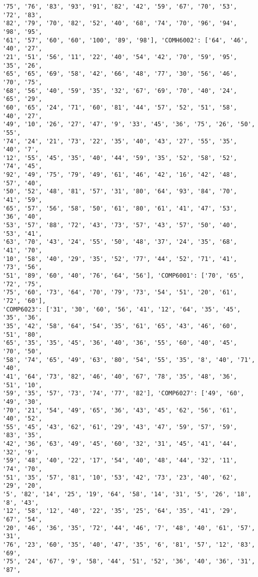 \documentclass[11pt]{article}
\begin{document}
\begin{Verbatim}[commandchars=\\\{\}]
'75', '76', '83', '93', '91', '82', '42', '59', '67', '70', '53', '72', '83',
'82', '79', '70', '82', '52', '40', '68', '74', '70', '96', '94', '98', '95',
'61', '57', '60', '60', '100', '89', '98'], 'COMH6002': ['64', '46', '40', '27',
'21', '51', '56', '11', '22', '40', '54', '42', '70', '59', '95', '35', '26',
'65', '65', '69', '58', '42', '66', '48', '77', '30', '56', '46', '70', '75',
'68', '56', '40', '59', '35', '32', '67', '69', '70', '40', '24', '65', '29',
'60', '65', '24', '71', '60', '81', '44', '57', '52', '51', '58', '40', '27',
'49', '10', '26', '27', '47', '9', '33', '45', '36', '75', '26', '50', '55',
'74', '24', '21', '73', '22', '35', '40', '43', '27', '55', '35', '40', '7',
'12', '55', '45', '35', '40', '44', '59', '35', '52', '58', '52', '74', '45',
'92', '49', '75', '79', '49', '61', '46', '42', '16', '42', '48', '57', '40',
'50', '52', '48', '81', '57', '31', '80', '64', '93', '84', '70', '41', '59',
'65', '57', '56', '58', '50', '61', '80', '61', '41', '47', '53', '36', '40',
'53', '57', '88', '72', '43', '73', '57', '43', '57', '50', '40', '53', '41',
'63', '70', '43', '24', '55', '50', '48', '37', '24', '35', '68', '41', '70',
'10', '58', '40', '29', '35', '52', '77', '44', '52', '71', '41', '73', '56',
'51', '89', '60', '40', '76', '64', '56'], 'COMP6001': ['70', '65', '72', '75',
'75', '60', '73', '64', '70', '79', '73', '54', '51', '20', '61', '72', '60'],
'COMP6023': ['31', '30', '60', '56', '41', '12', '64', '35', '45', '35', '36',
'35', '42', '58', '64', '54', '35', '61', '65', '43', '46', '60', '51', '80',
'65', '35', '35', '45', '36', '40', '36', '55', '60', '40', '45', '70', '50',
'58', '74', '65', '49', '63', '80', '54', '55', '35', '8', '40', '71', '40',
'41', '64', '73', '82', '46', '40', '67', '78', '35', '48', '36', '51', '10',
'59', '35', '57', '73', '74', '77', '82'], 'COMP6027': ['49', '60', '49', '30',
'70', '21', '54', '49', '65', '36', '43', '45', '62', '56', '61', '40', '52',
'55', '45', '43', '62', '61', '29', '43', '47', '59', '57', '59', '83', '35',
'42', '36', '63', '49', '45', '60', '32', '31', '45', '41', '44', '32', '9',
'59', '48', '40', '22', '17', '54', '40', '48', '44', '32', '11', '74', '70',
'51', '35', '57', '81', '10', '53', '42', '73', '23', '40', '62', '29', '20',
'5', '82', '14', '25', '19', '64', '58', '14', '31', '5', '26', '18', '8', '43',
'12', '58', '12', '40', '22', '35', '25', '64', '35', '41', '29', '67', '54',
'20', '46', '36', '35', '72', '44', '46', '7', '48', '40', '61', '57', '31',
'76', '23', '60', '35', '40', '47', '35', '6', '81', '57', '12', '83', '69',
'75', '24', '67', '9', '58', '44', '51', '52', '36', '40', '36', '31', '87',

\end{Verbatim}
\end{document}
